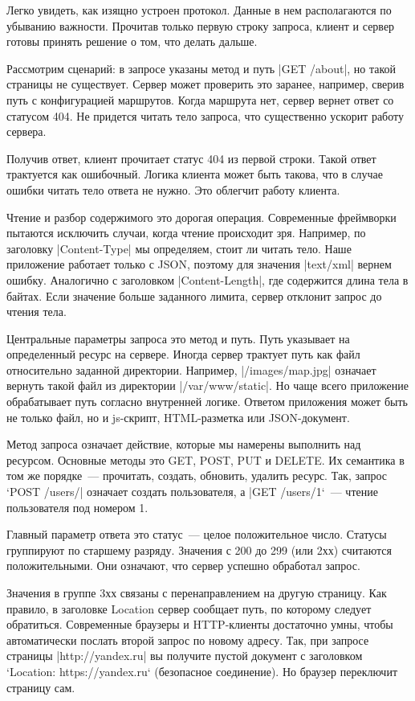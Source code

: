 Легко увидеть, как изящно устроен протокол. Данные в нем располагаются по
убыванию важности. Прочитав только первую строку запроса, клиент и сервер готовы
принять решение о том, что делать дальше.

Рассмотрим сценарий: в запросе указаны метод и путь \spverb|GET /about|, но такой
страницы не существует. Сервер может проверить это заранее, например, сверив
путь с конфигурацией маршрутов. Когда маршрута нет, сервер вернет ответ со
статусом 404. Не придется читать тело запроса, что существенно ускорит работу
сервера.

Получив ответ, клиент прочитает статус 404 из первой строки. Такой ответ
трактуется как ошибочный. Логика клиента может быть такова, что в случае ошибки
читать тело ответа не нужно. Это облегчит работу клиента.

Чтение и разбор содержимого это дорогая операция. Современные фреймворки
пытаются исключить случаи, когда чтение происходит зря. Например, по заголовку
\spverb|Content-Type| мы определяем, стоит ли читать тело. Наше приложение работает
только с JSON, поэтому для значения \spverb|text/xml| вернем ошибку. Аналогично с
заголовком \spverb|Content-Length|, где содержится длина тела в байтах. Если значение
больше заданного лимита, сервер отклонит запрос до чтения тела.

Центральные параметры запроса это метод и путь. Путь указывает на определенный
ресурс на сервере. Иногда сервер трактует путь как файл относительно заданной
директории. Например, \spverb|/images/map.jpg| означает вернуть такой файл из
директории \spverb|/var/www/static|. Но чаще всего приложение обрабатывает путь
согласно внутренней логике. Ответом приложения может быть не только файл, но и
js-скрипт, HTML-разметка или JSON-документ.

Метод запроса означает действие, которые мы намерены выполнить над
ресурсом. Основные методы это GET, POST, PUT и DELETE. Их семантика в том же
порядке~--- прочитать, создать, обновить, удалить ресурс. Так, запрос `POST
/users/\spverb| означает создать пользователя, а |GET /users/1`~--- чтение пользователя
под номером 1.

Главный параметр ответа это статус~--- целое положительное число. Статусы
группируют по старшему разряду. Значения с 200 до 299 (или 2хх) считаются
положительными. Они означают, что сервер успешно обработал запрос.

Значения в группе 3хх связаны с перенаправлением на другую страницу. Как
правило, в заголовке Location сервер сообщает путь, по которому следует
обратиться. Современные браузеры и HTTP-клиенты достаточно умны, чтобы
автоматически послать второй запрос по новому адресу. Так, при запросе страницы
\spverb|http://yandex.ru| вы получите пустой документ с заголовком `Location:
https://yandex.ru` (безопасное соединение). Но браузер переключит страницу сам.

